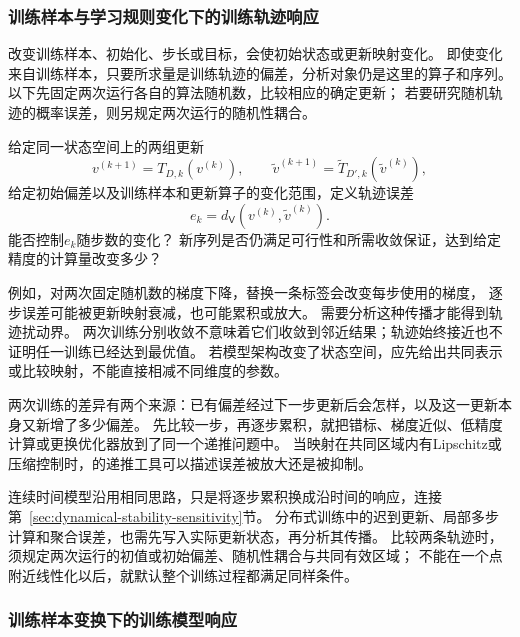 \subsubsection{训练样本与学习规则变化下的训练轨迹响应}
\label{sec:future-analysis-iteration-perturbation}

改变训练样本、初始化、步长或目标，会使初始状态或更新映射变化。
即使变化来自训练样本，只要所求量是训练轨迹的偏差，分析对象仍是这里的算子和序列。
以下先固定两次运行各自的算法随机数，比较相应的确定更新；
若要研究随机轨迹的概率误差，则另规定两次运行的随机性耦合。

\begin{mathproblem}[训练轨迹对训练样本和学习规则的响应]
  \label{question:future-iteration-perturbation}
  给定同一状态空间上的两组更新
  \[
    v^{(k+1)}=T_{D,k}(v^{(k)}),\qquad
    \widetilde v^{(k+1)}=\widetilde T_{D',k}(\widetilde v^{(k)}),
  \]
  给定初始偏差以及训练样本和更新算子的变化范围，定义轨迹误差
  \[
    e_k=d_{\mathsf V}(v^{(k)},\widetilde v^{(k)}).
  \]
  能否控制$e_k$随步数的变化？
  新序列是否仍满足可行性和所需收敛保证，达到给定精度的计算量改变多少？
\end{mathproblem}

例如，对两次固定随机数的梯度下降，替换一条标签会改变每步使用的梯度，
逐步误差可能被更新映射衰减，也可能累积或放大。
需要分析这种传播才能得到轨迹扰动界。
两次训练分别收敛不意味着它们收敛到邻近结果；轨迹始终接近也不证明任一训练已经达到最优值。
若模型架构改变了状态空间，应先给出共同表示或比较映射，不能直接相减不同维度的参数。

两次训练的差异有两个来源：已有偏差经过下一步更新后会怎样，以及这一更新本身又新增了多少偏差。
先比较一步，再逐步累积，就把错标、梯度近似、低精度计算或更换优化器放到了同一个递推问题中。
当映射在共同区域内有Lipschitz或压缩控制时，的递推工具可以描述误差被放大还是被抑制。

连续时间模型沿用相同思路，只是将逐步累积换成沿时间的响应，连接第~\ref{sec:dynamical-stability-sensitivity}节。
分布式训练中的迟到更新、局部多步计算和聚合误差，也需先写入实际更新状态，再分析其传播。
比较两条轨迹时，须规定两次运行的初值或初始偏差、随机性耦合与共同有效区域；
不能在一个点附近线性化以后，就默认整个训练过程都满足同样条件。

\subsubsection{训练样本变换下的训练模型响应}
\label{sec:future-analysis-perturbation-map}

